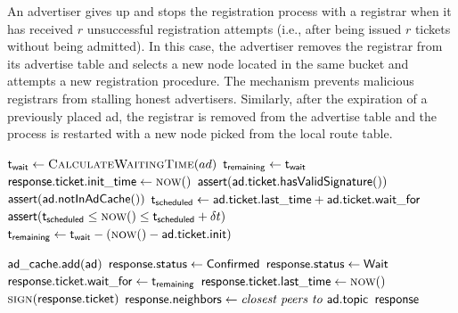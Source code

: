 An advertiser gives up and stops the registration process with a registrar when it has received $r$ unsuccessful registration attempts (i.e., after being issued $r$ tickets without being admitted). In this case, the advertiser removes the registrar from its advertise table and selects a new node located in the same bucket and attempts a new registration procedure. The mechanism prevents malicious registrars from stalling honest advertisers.
Similarly, after the expiration of a previously placed ad, the registrar is removed from the advertise table and the process is restarted with a new node picked from the local route table.%

\begin{algorithm}[]%
    \caption{%
        Admission algorithm run by registrars.
    }%
    \label{alg:registrar_register}%
    \begin{algorithmic}[1]%
        \footnotesize%
            \State $\algvar{t_{wait}} \gets \Call{CalculateWaitingTime}{ad}$
                \State $\mathsf{t_{remaining}} \gets \mathsf{t_{wait}}$
                \State $\algvar{response.ticket.init\_time} \gets \Call{now}$
            \Else
                \State $ \mathsf{assert(ad.ticket.hasValidSignature ())} $
                \State $ \mathsf{assert(ad.notInAdCache ())} $
                \State $\mathsf{t_{scheduled}} \gets \mathsf{ad.ticket.last\_time} + \mathsf{ad.ticket.wait\_for}$
                \State $ \algvar{assert}(\algvar{t_{scheduled}} \le \Call{now}{ } \le \algvar{t_{scheduled}} + \delta t) $
                \State $\algvar{t_{remaining}} \gets \algvar{t_{wait}}  - (\Call{now}{ } - \algvar{ad.ticket.init})$
            \EndIf

                \State $\mathsf{ad\_cache.add}({\mathsf{ad}})$
                \State $\mathsf{response.status} \gets \mathsf{Confirmed}$
            \Else
                \State $\mathsf{response.status} \gets \mathsf{Wait}$
                \State $\mathsf{response.ticket.wait\_for} \gets \mathsf{t_{remaining}}$
                \State $\algvar{response.ticket.last\_time} \gets \Call{now}{ }$
                \State $\Call{sign}{\algvar{response.ticket}}$
            \EndIf
            \State $\mathsf{response.neighbors} \gets \textit{closest peers to } \mathsf{ad.topic}$
            \State \Return $\mathsf{response}$
        \EndProcedure
    \end{algorithmic}%
\end{algorithm}%

